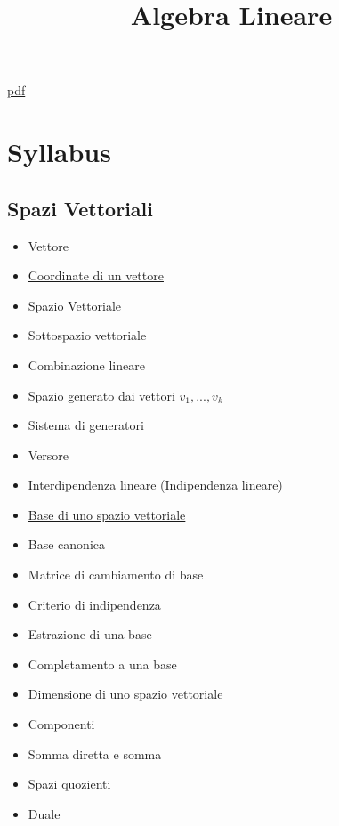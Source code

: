 \documentclass[a4paper,10pt]{article}
\title{Algebra Lineare}
\begin{document}
\maketitle
\href{AlgebraLineare.pdf}{pdf} 
\section*{Syllabus}
\subsection{Spazi Vettoriali}
\begin{itemize}
 \item Vettore
 \item \href{CoordinateVettore.html}{Coordinate di un vettore}
 \item \href{SpazioVettoriale.html}{Spazio Vettoriale}
 \item Sottospazio vettoriale
 \item Combinazione lineare
 \item Spazio generato dai vettori $v_1, ..., v_k$
 \item Sistema di generatori
 \item Versore
 \item Interdipendenza lineare (Indipendenza lineare)
 \item \href{Base.html}{Base di uno spazio vettoriale}
 \item Base canonica
 \item Matrice di cambiamento di base
 \item Criterio di indipendenza
 \item Estrazione di una base
 \item Completamento a una base
 \item \href{Dimensione.html}{Dimensione di uno spazio vettoriale}
 \item Componenti
 \item Somma diretta e somma 
 \item Spazi quozienti
 \item Duale
\end{itemize}
\end{document}
